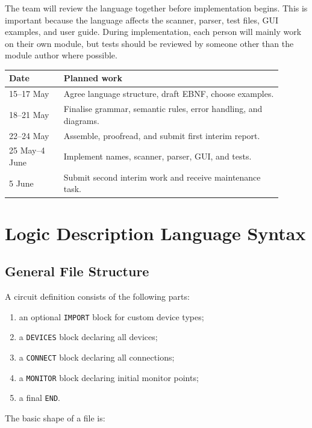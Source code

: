 \documentclass[10pt,a4paper]{article}
\begin{document}
The team will review the language together before implementation begins. This
is important because the language affects the scanner, parser, test files, GUI
examples, and user guide. During implementation, each person will mainly work
on their own module, but tests should be reviewed by someone other than the
module author where possible.

\begin{center}
\begin{tabular}{|p{0.18\linewidth}|p{0.72\linewidth}|}
\hline
\textbf{Date} & \textbf{Planned work}\\
\hline
15--17 May & Agree language structure, draft EBNF, choose examples.\\
\hline
18--21 May & Finalise grammar, semantic rules, error handling, and diagrams.\\
\hline
22--24 May & Assemble, proofread, and submit first interim report.\\
\hline
25 May--4 June & Implement names, scanner, parser, GUI, and tests.\\
\hline
5 June & Submit second interim work and receive maintenance task.\\
\hline
\end{tabular}
\end{center}

\section{Logic Description Language Syntax}

\subsection{General File Structure}

A circuit definition consists of the following parts:

\begin{enumerate}
    \item an optional \texttt{IMPORT} block for custom device types;
    \item a \texttt{DEVICES} block declaring all devices;
    \item a \texttt{CONNECT} block declaring all connections;
    \item a \texttt{MONITOR} block declaring initial monitor points;
    \item a final \texttt{END}.
\end{enumerate}

The basic shape of a file is:
\end{document}
